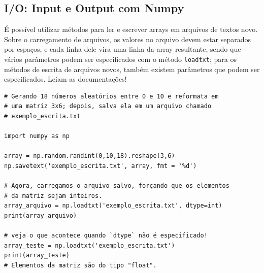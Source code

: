 \documentclass[../numerical_methods.tex]{subfiles}
\begin{document}
\subsection{I/O: Input e Output com Numpy}
É possível utilizar métodos para ler e escrever arrays em arquivos de textos novo. Sobre o carregamento de arquivos, os valores no arquivo devem estar separados por espaços, e cada linha dele vira uma linha da array resultante, sendo que vários parâmetros podem ser especificados com o método \texttt{loadtxt}; para os métodos de escrita de arquivos novos, também existem parâmetros que podem ser especificados. Leiam as documentações!
\begin{verbatim}
# Gerando 18 números aleatórios entre 0 e 10 e reformata em 
# uma matriz 3x6; depois, salva ela em um arquivo chamado 
# exemplo_escrita.txt

import numpy as np

array = np.random.randint(0,10,18).reshape(3,6)
np.savetext('exemplo_escrita.txt', array, fmt = '%d')

# Agora, carregamos o arquivo salvo, forçando que os elementos 
# da matriz sejam inteiros. 
array_arquivo = np.loadtxt('exemplo_escrita.txt', dtype=int)
print(array_arquivo)

# veja o que acontece quando `dtype` não é especificado! 
array_teste = np.loadtxt('exemplo_escrita.txt')
print(array_teste)
# Elementos da matriz são do tipo "float".
\end{verbatim}
\end{document}
